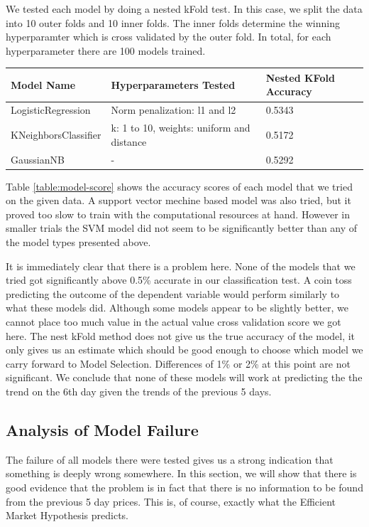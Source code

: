 \documentclass{report}
\begin{document}
We tested each model by doing a nested kFold test. In this case, we split the data into 10 outer folds and 10 inner folds. The inner folds determine the winning hyperparamter which is cross validated by the outer fold. In total, for each hyperparameter there are 100 models trained.

\begin{center}
  
  \begin{tabular}{l | l | l}
	  Model Name & Hyperparameters Tested & Nested KFold Accuracy \\ \hline
	  LogisticRegression & Norm penalization: l1 and l2 & 0.5343 \\ \hline
	  KNeighborsClassifier & k: 1 to 10, weights: uniform and distance & 0.5172 \\ \hline
	  GaussianNB & - & 0.5292
	  \label{table:model-score}
  \end{tabular}
\end{center}

Table \ref{table:model-score} shows the accuracy scores of each model that we tried on the given data. A support vector mechine based model was also tried, but it proved too slow to train with the computational resources at hand. However in smaller trials the SVM model did not seem to be significantly better than any of the model types presented above.

It is immediately clear that there is a problem here. None of the models that we tried got significantly above 0.5\% accurate in our classification test. A coin toss predicting the outcome of the dependent variable would perform similarly to what these models did. Although some models appear to be slightly better, we cannot place too much value in the actual value cross validation score we got here. The nest kFold method does not give us the true accuracy of the model, it only gives us an estimate which should be good enough to choose which model we carry forward to Model Selection. Differences of 1\% or 2\% at this point are not significant. We conclude that none of these models will work at predicting the the trend on the 6th day given the trends of the previous 5 days.

\subsection{Analysis of Model Failure}


The failure of all models there were tested gives us a strong indication that something is deeply wrong somewhere. In this section, we will show that there is good evidence that the problem is in fact that there is no information to be found from the previous 5 day prices. This is, of course, exactly what the Efficient Market Hypothesis predicts.
\end{document}
